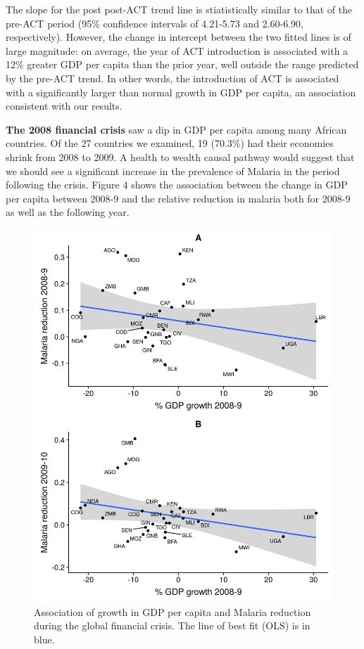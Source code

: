 \documentclass[9pt,twocolumn,twoside,lineno]{pnas-new}
\begin{document}
The slope for the post post-ACT trend line is stiatistically similar to that of the pre-ACT period (95\% confidence intervals of 4.21-5.73 and 2.60-6.90, respectively). However, the change in intercept between the two fitted lines is of large magnitude: on average, the year of ACT introduction is associated with a 12\% greater GDP per capita than the prior year, well outside the range predicted by the pre-ACT trend. In other words, the introduction of ACT is associated with a significantly larger than normal growth in GDP per capita, an association consistent with our results.

\textbf{The 2008 financial crisis} saw a dip in GDP per capita among many African countries. Of the 27 countries we examined, 19 (70.3\%) had their economies shrink from 2008 to 2009. A health to wealth causal pathway would suggest that we should see a significant increase in the prevalence of Malaria in the period following the crisis. Figure 4 shows the association between the change in GDP per capita between 2008-9 and the relative reduction in malaria both for 2008-9 as well as the following year.

\begin{figure}%
\centering
\includegraphics[width=.95\linewidth]{../figures/crisis}
\caption{Association of growth in GDP per capita and Malaria reduction during the global financial crisis. The line of best fit (OLS) is in blue.}
\label{fig:act}
\end{figure}
\end{document}
